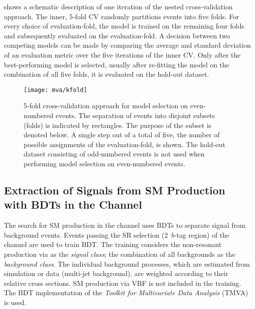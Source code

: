  shows a schematic description of one
iteration of the nested cross-validation approach. The inner, 5-fold
CV randomly partitions events into five folds. For every choice of
evaluation-fold, the model is trained on the remaining four folds and
subsequently evaluated on the evaluation-fold. A decision between two
competing models can be made by comparing the average and standard
deviation of an evaluation metric over the five iterations of the inner
CV. Only after the best-performing model is selected, usually after
re-fitting the model on the combination of all five folds, it is
evaluated on the hold-out dataset.

\begin{figure}[htbp]
  \centering

  \texttt{[image: mva/kfold]}

  \caption[5-fold cross-validation approach for model selection.]{5-fold
    cross-validation approach for model selection on even-numbered events. The
    separation of events into disjoint subsets (folds) is indicated by
    rectangles. The purpose of the subset is denoted below. A single step out of
    a total of five, the number of possible assignments of the evaluation-fold,
    is shown. The hold-out dataset consisting of odd-numbered events is not used
    when performing model selection on even-numbered events.}%
  \label{fig:cross_validation}
\end{figure}



\subsection{Extraction of Signals from SM \HH Production with BDTs in
  the \hadhad Channel}%
\label{sec:mva_smbdt}

The search for SM \HH production in the \hadhad channel uses BDTs to
separate signal from background events. Events passing the SR
selection (2~$b$-tag region) of the \hadhad channel are used to
train BDT. The training considers the non-resonant \HH production via
\ggF as the \emph{signal class}; the combination of all backgrounds as
the \emph{background class}. The individual background processes,
which are estimated from simulation or data (multi-jet background),
are weighted according to their relative cross sections. SM \HH
production via VBF is not included in the training.
The BDT implementation of the \emph{Toolkit for Multivariate Data
  Analysis} (TMVA)~\cite{TMVA} is used.


